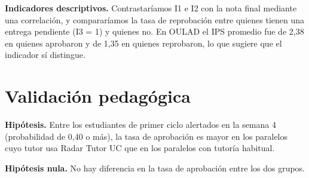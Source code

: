 \documentclass[11pt]{article}
\begin{document}
\textbf{Indicadores descriptivos.} Contrastaríamos I1 e I2 con la nota final mediante una correlación, y compararíamos la tasa de reprobación entre quienes tienen una entrega pendiente (I3 = 1) y quienes no. En OULAD el IPS promedio fue de 2,38 en quienes aprobaron y de 1,35 en quienes reprobaron, lo que sugiere que el indicador sí distingue.

\section{Validación pedagógica}

\textbf{Hipótesis.} Entre los estudiantes de primer ciclo alertados en la semana 4 (probabilidad de 0,40 o más), la tasa de aprobación es mayor en los paralelos cuyo tutor usa Radar Tutor UC que en los paralelos con tutoría habitual.

\textbf{Hipótesis nula.} No hay diferencia en la tasa de aprobación entre los dos grupos.
\end{document}
